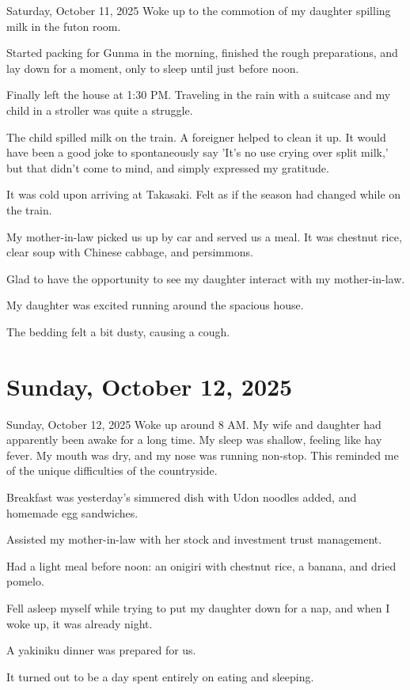 \documentclass[dvipdfmx, autodetect-engine, aspectratio=169, 10.5pt]{beamer}
\begin{document}
\begin{frame}{Saturday, October 11, 2025}
	Woke up to the commotion of my daughter spilling milk in the futon room.

	Started packing for Gunma in the morning, finished the rough preparations, and lay down for a moment, only to sleep until just before noon.

	Finally left the house at 1:30 PM.
	Traveling in the rain with a suitcase and my child in a stroller was quite a struggle.

	The child spilled milk on the train.
	A foreigner helped to clean it up.
	It would have been a good joke to spontaneously say 'It's no use crying over split milk,' but that didn't come to mind, and simply expressed my gratitude.

	It was cold upon arriving at Takasaki.
	Felt as if the season had changed while on the train.

	My mother-in-law picked us up by car and served us a meal.
	It was chestnut rice, clear soup with Chinese cabbage, and persimmons.

	Glad to have the opportunity to see my daughter interact with my mother-in-law.

	My daughter was excited running around the spacious house.

	The bedding felt a bit dusty, causing a cough.
\end{frame}

\section{Sunday, October 12, 2025}

\begin{frame}{Sunday, October 12, 2025}
	Woke up around 8 AM.
	My wife and daughter had apparently been awake for a long time.
	My sleep was shallow, feeling like hay fever.
	My mouth was dry, and my nose was running non-stop.
	This reminded me of the unique difficulties of the countryside.

	Breakfast was yesterday's simmered dish with Udon noodles added, and homemade egg sandwiches.

	Assisted my mother-in-law with her stock and investment trust management.

	Had a light meal before noon: an onigiri with chestnut rice, a banana, and dried pomelo.

	Fell asleep myself while trying to put my daughter down for a nap, and when I woke up, it was already night.

	A yakiniku dinner was prepared for us.

	It turned out to be a day spent entirely on eating and sleeping.
\end{frame}
\end{document}
